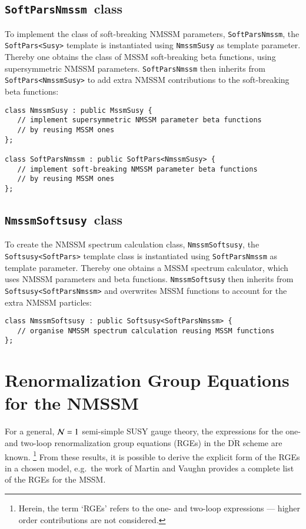 \documentclass[final,3p,times,pdflatex]{elsarticle}
\def\code#1{\small{\tt #1}\normalsize}
\begin{document}
\subsection{\code{SoftParsNmssm}~class}
\label{nmssmsoftpars}

To implement the class of soft-breaking NMSSM parameters,
\code{SoftParsNmssm}, the \code{SoftPars<Susy>} template is
instantiated using \code{NmssmSusy} as template parameter.  Thereby
one obtains the class of MSSM soft-breaking beta functions, using
supersymmetric NMSSM parameters.  \code{SoftParsNmssm} then inherits
from \code{SoftPars<NmssmSusy>} to add extra NMSSM contributions to
the soft-breaking beta functions:
%
\begin{verbatim}
class NmssmSusy : public MssmSusy {
   // implement supersymmetric NMSSM parameter beta functions
   // by reusing MSSM ones
};

class SoftParsNmssm : public SoftPars<NmssmSusy> {
   // implement soft-breaking NMSSM parameter beta functions
   // by reusing MSSM ones
};
\end{verbatim}

\subsection{\code{NmssmSoftsusy}~class}
\label{nmssmsoftsusy}

To create the NMSSM spectrum calculation class, \code{NmssmSoftsusy},
the \code{Softsusy<SoftPars>} template class is instantiated using
\code{SoftParsNmssm} as template parameter.  Thereby one obtains a
MSSM spectrum calculator, which uses NMSSM parameters and beta
functions.  \code{NmssmSoftsusy} then inherits from
\code{Softsusy<SoftParsNmssm>} and overwrites MSSM functions to
account for the extra NMSSM particles:
%
\begin{verbatim}
class NmssmSoftsusy : public Softsusy<SoftParsNmssm> {
   // organise NMSSM spectrum calculation reusing MSSM functions
};
\end{verbatim}

\section{Renormalization Group Equations for the NMSSM}
For a general, ${\cal N}=1$ semi-simple SUSY gauge theory, the expressions \cite{MV94,Yam94} 
for the one- and two-loop renormalization group equations (RGEs) in the 
$\overline{\mbox{DR}}$ scheme are known.%
\footnote{Herein, the term `RGEs' refers to the one- and two-loop expressions --- higher order contributions are not considered.}
From these results, it is possible to derive the explicit form of the RGEs in a 
chosen model, e.g.\ the work of Martin and Vaughn \cite{MV94} provides a 
complete list of the RGEs for the MSSM.  
\end{document}

